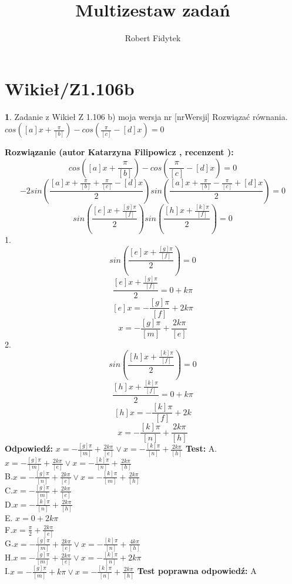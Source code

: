 \documentclass[12pt, a4paper]{article}
\title{Multizestaw zadań}
\author{Robert Fidytek}
\date{}
\theoremstyle{definition} %
\newtheorem{zad}{}
\newcommand{\kategoria}[1]{\section{#1}} %
\newcommand{\zadStart}[1]{\begin{zad}#1\newline} %
\newcommand{\zadStop}{\end{zad}}   %
\newcommand{\rozwStart}[2]{\noindent \textbf{Rozwiązanie (autor #1 , recenzent #2): }\newline} %
\newcommand{\rozwStop}{\newline}                                            %
\newcommand{\odpStart}{\noindent \textbf{Odpowiedź:}\newline}    %
\newcommand{\odpStop}{\newline}                                             %
\newcommand{\testStart}{\noindent \textbf{Test:}\newline} %
\newcommand{\testStop}{\newline} %
\newcommand{\kluczStart}{\noindent \textbf{Test poprawna odpowiedź:}\newline} %
\newcommand{\kluczStop}{\newline} %
\begin{document}
\maketitle


\kategoria{Wikieł/Z1.106b}
\zadStart{Zadanie z Wikieł Z 1.106 b) moja wersja nr [nrWersji]}
Rozwiązać równania.\\
 $cos\left([a]x+\frac{\pi}{[b]}\right)-cos\left(\frac{\pi}{[c]}-[d]x\right)=0$
\zadStop
\rozwStart{Katarzyna Filipowicz}{}
$$
cos\left([a]x+\frac{\pi}{[b]}\right)-cos\left(\frac{\pi}{[c]}-[d]x\right)=0
$$
$$
-2sin\left(\frac{[a]x+\frac{\pi}{[b]}+\frac{\pi}{[c]}-[d]x}{2}\right)sin\left(\frac{[a]x+\frac{\pi}{[b]}-\frac{\pi}{[c]}+[d]x}{2}\right)=0
$$ $$
sin\left(\frac{[e]x+\frac{[g]\pi}{[f]}}{2}\right)sin\left(\frac{[h]x+\frac{[k]\pi}{[f]}}{2}\right)=0
$$
1. 
$$sin\left(\frac{[e]x+\frac{[g]\pi}{[f]}}{2}\right)=0$$
 $$
\frac{[e]x+\frac{[g]\pi}{[f]}}{2}=0+k\pi 
 $$ $$
 [e]x=-\frac{[g]\pi}{[f]}+2k\pi 
 $$ $$
x=-\frac{[g]\pi}{[m]}+\frac{2k\pi}{[e]} 
$$ 
2. 
$$sin\left(\frac{[h]x+\frac{[k]\pi}{[f]}}{2}\right)=0$$
$$
\frac{[h]x+\frac{[k]\pi}{[f]}}{2}=0+k\pi 
 $$ $$
 [h]x=-\frac{[k]\pi}{[f]}+2k
 $$ $$
x=-\frac{[k]\pi}{[n]}+\frac{2k\pi}{[h]} 
$$
\rozwStop
\odpStart
$x=-\frac{[g]\pi}{[m]}+\frac{2k\pi}{[e]}   \vee x=-\frac{[k]\pi}{[n]}+\frac{2k\pi}{[h]}$
\odpStop
\testStart
A.$x=-\frac{[g]\pi}{[m]}+\frac{2k\pi}{[e]}   \vee x=-\frac{[k]\pi}{[n]}+\frac{2k\pi}{[h]}$\\
B.$x=-\frac{[g]\pi}{[n]}+\frac{2k\pi}{[e]}   \vee x=-\frac{[k]\pi}{[m]}+\frac{2k\pi}{[h]}$\\
C.$x=-\frac{[g]\pi}{[m]}+\frac{2k\pi}{[e]}$\\
D.$x=-\frac{[k]\pi}{[n]}+\frac{2k\pi}{[h]}$\\
E. $x=0+2k\pi$\\
F.$x=\frac{\pi}{2}+\frac{2k\pi}{[e]}$\\
G.$x=-\frac{[g]\pi}{[m]}+\frac{2k\pi}{[e]}   \vee x=-\frac{[k]\pi}{[n]}+\frac{4k\pi}{[h]}$\\
H.$x=-\frac{[g]\pi}{[m]}+\frac{2k\pi}{[e]}   \vee x=-\frac{[k]\pi}{[n]}+2k\pi$\\
I.$x=-\frac{[g]\pi}{[m]}+k\pi  \vee x=-\frac{[k]\pi}{[n]}+\frac{2k\pi}{[h]}$
\testStop
\kluczStart
A
\kluczStop
\end{document}
